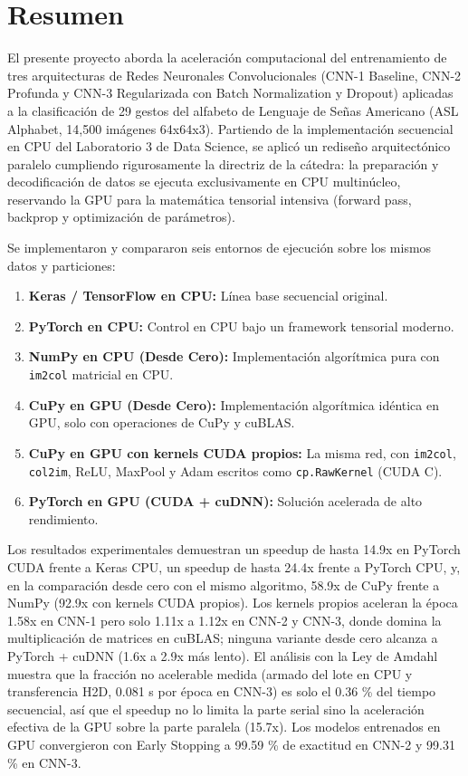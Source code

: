 \documentclass[
  11pt,
]{article}
\providecommand{\tightlist}{%
  \setlength{\itemsep}{0pt}\setlength{\parskip}{0pt}}
\begin{document}
\section{Resumen}\label{resumen-ejecutivo}

El presente proyecto aborda la aceleración computacional del
entrenamiento de tres arquitecturas de Redes Neuronales
Convolucionales (CNN-1 Baseline, CNN-2 Profunda y CNN-3
Regularizada con Batch Normalization y Dropout) aplicadas a
la clasificación de 29 gestos del alfabeto de Lenguaje de
Señas Americano (ASL Alphabet, 14,500 imágenes 64x64x3).
Partiendo de la implementación secuencial en CPU del
Laboratorio 3 de Data Science, se aplicó un rediseño
arquitectónico paralelo cumpliendo rigurosamente la
directriz de la cátedra: la preparación y
decodificación de datos se ejecuta exclusivamente en CPU
multinúcleo, reservando la GPU para la matemática tensorial
intensiva (forward pass, backprop y
optimización de parámetros).

Se implementaron y compararon seis entornos de ejecución
sobre los mismos datos y particiones:

\begin{enumerate}
\def\labelenumi{\arabic{enumi}.}
\tightlist
\item
  \textbf{Keras / TensorFlow en CPU:} Línea base secuencial
  original.
\item
  \textbf{PyTorch en CPU:} Control en CPU bajo un framework
  tensorial moderno.
\item
  \textbf{NumPy en CPU (Desde Cero):} Implementación
  algorítmica pura con \texttt{im2col} matricial en CPU.
\item
  \textbf{CuPy en GPU (Desde Cero):} Implementación
  algorítmica idéntica en GPU, solo con operaciones de CuPy
  y cuBLAS.
\item
  \textbf{CuPy en GPU con kernels CUDA propios:} La misma
  red, con \texttt{im2col}, \texttt{col2im}, ReLU, MaxPool y
  Adam escritos como \texttt{cp.RawKernel} (CUDA C).
\item
  \textbf{PyTorch en GPU (CUDA + cuDNN):} Solución acelerada
  de alto rendimiento.
\end{enumerate}

Los resultados experimentales demuestran un speedup
de hasta 14.9x en PyTorch CUDA frente a Keras CPU, un
speedup de hasta 24.4x frente a PyTorch CPU, y, en
la comparación desde cero con el mismo algoritmo,
58.9x de CuPy frente a NumPy (92.9x con
kernels CUDA propios). Los kernels propios aceleran la época
1.58x en CNN-1 pero solo 1.11x a 1.12x en CNN-2 y CNN-3,
donde domina la multiplicación de matrices en cuBLAS;
ninguna variante desde cero alcanza a PyTorch + cuDNN (1.6x
a 2.9x más lento). El análisis con la Ley de Amdahl muestra
que la fracción no acelerable medida (armado del lote en CPU
y transferencia H2D, 0.081 s por época en CNN-3) es solo el
0.36 \% del tiempo secuencial, así que el speedup no lo
limita la parte serial sino la aceleración efectiva de la
GPU sobre la parte paralela (15.7x). Los modelos entrenados
en GPU convergieron con Early Stopping a 99.59 \% de
exactitud en CNN-2 y 99.31 \% en CNN-3.
\end{document}

